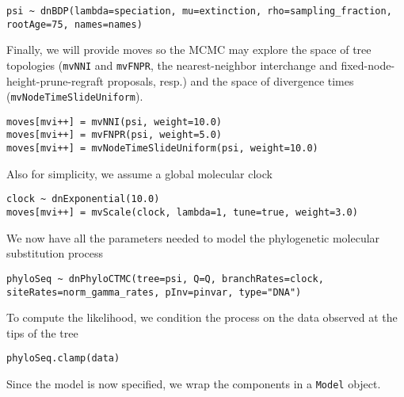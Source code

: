 {\tt \begin{snugshade*}
\begin{lstlisting}
psi ~ dnBDP(lambda=speciation, mu=extinction, rho=sampling_fraction, rootAge=75, names=names)
\end{lstlisting}
\end{snugshade*}}

Finally, we will provide moves so the MCMC may explore the space of tree topologies ({\tt mvNNI} and {\tt mvFNPR}, the nearest-neighbor interchange and fixed-node-height-prune-regraft proposals, resp.) and the space of divergence times ({\tt mvNodeTimeSlideUniform}).

{\tt \begin{snugshade*}
\begin{lstlisting}
moves[mvi++] = mvNNI(psi, weight=10.0)
moves[mvi++] = mvFNPR(psi, weight=5.0)
moves[mvi++] = mvNodeTimeSlideUniform(psi, weight=10.0)
\end{lstlisting}
\end{snugshade*}}

Also for simplicity, we assume a global molecular clock

{\tt \small \begin{snugshade*}
\begin{lstlisting}
clock ~ dnExponential(10.0)
moves[mvi++] = mvScale(clock, lambda=1, tune=true, weight=3.0)
\end{lstlisting}
\end{snugshade*}}

We now have all the parameters needed to model the phylogenetic molecular substitution process

{\tt \begin{snugshade*}
\begin{lstlisting}
phyloSeq ~ dnPhyloCTMC(tree=psi, Q=Q, branchRates=clock, siteRates=norm_gamma_rates, pInv=pinvar, type="DNA")
\end{lstlisting}
\end{snugshade*}}

To compute the likelihood, we condition the process on the data observed at the tips of the tree

{\tt \begin{snugshade*}
\begin{lstlisting}
phyloSeq.clamp(data)
\end{lstlisting}
\end{snugshade*}}

Since the model is now specified, we wrap the components in a {\tt Model} object.


